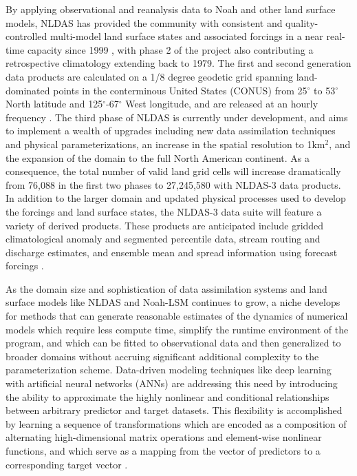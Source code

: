 By applying observational and reanalysis data to Noah and other land surface models, NLDAS has provided the community with consistent and quality-controlled multi-model land surface states and associated forcings in a near real-time capacity since 1999 \citep{cosgrove_real-time_2003}, with phase 2 of the project also contributing a retrospective climatology extending back to 1979. The first and second generation data products are calculated on a 1/8 degree geodetic grid spanning land-dominated points in the conterminous United States (CONUS) from 25$^\circ$ to 53$^\circ$ North latitude and 125$^\circ$-67$^\circ$ West longitude, and are released at an hourly frequency  \citep{mitchell_multi-institution_2004} \citep{xia_continental-scale_2012}. The third phase of NLDAS is currently under development, and aims to implement a wealth of upgrades including new data assimilation techniques and physical parameterizations, an increase in the spatial resolution to 1km$^2$, and the expansion of the domain to the full North American continent. As a consequence, the total number of valid land grid cells will increase dramatically from 76,088 in the first two phases to 27,245,580 with NLDAS-3 data products. In addition to the larger domain and updated physical processes used to develop the forcings and land surface states, the NLDAS-3 data suite will feature a variety of derived products. These products are anticipated include gridded climatological anomaly and segmented percentile data, stream routing and discharge estimates, and ensemble mean and spread information using forecast forcings \citep{kumar_north_2024}.

As the domain size and sophistication of data assimilation systems and land surface models like NLDAS and Noah-LSM continues to grow, a niche develops for methods that can generate reasonable estimates of the dynamics of numerical models which require less compute time, simplify the runtime environment of the program, and which can be fitted to observational data and then generalized to broader domains without accruing significant additional complexity to the parameterization scheme.  Data-driven modeling techniques like deep learning with artificial neural networks (ANNs) are addressing this need by introducing the ability to approximate the highly nonlinear and conditional relationships between arbitrary predictor and target datasets. This flexibility is accomplished by learning a sequence of transformations which are encoded as a composition of alternating high-dimensional matrix operations and element-wise nonlinear functions, and which serve as a mapping from the vector of predictors to a corresponding target vector \citep{hornik_multilayer_1989}.

